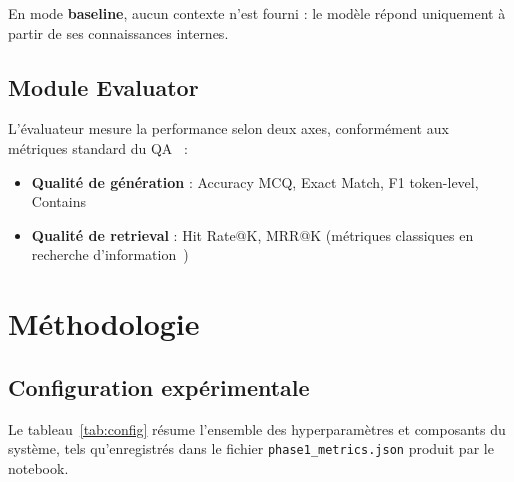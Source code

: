 \documentclass[12pt,a4paper]{article}
\begin{document}
En mode \textbf{baseline}, aucun contexte n'est fourni : le modèle répond uniquement à partir de ses connaissances internes.

\subsection{Module Evaluator}

L'évaluateur mesure la performance selon deux axes, conformément aux métriques standard du QA~\cite{rajpurkar2016squademnlp} :
\begin{itemize}[leftmargin=*]
  \item \textbf{Qualité de génération} : Accuracy MCQ, Exact Match, F1 token-level, Contains
  \item \textbf{Qualité de retrieval} : Hit Rate@K, MRR@K (métriques classiques en recherche d'information~\cite{karpukhin2020dense})
\end{itemize}

\section{Méthodologie}
\label{sec:methodologie}

\subsection{Configuration expérimentale}

Le tableau~\ref{tab:config} résume l'ensemble des hyperparamètres et composants du système, tels qu'enregistrés dans le fichier \texttt{phase1\_metrics.json} produit par le notebook.
\end{document}
